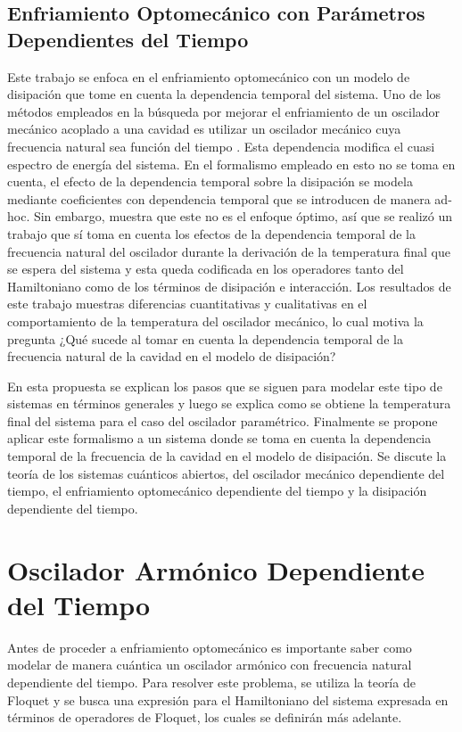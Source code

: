 \documentclass[10pt,a4paper]{report}
\begin{document}
\section{Enfriamiento Optomecánico con Parámetros Dependientes del Tiempo}

Este trabajo se enfoca en el enfriamiento optomecánico con un modelo de disipación que tome en cuenta la dependencia temporal del sistema. Uno de los métodos empleados en la búsqueda por mejorar el enfriamiento de un oscilador mecánico acoplado a una
cavidad es utilizar un oscilador mecánico cuya frecuencia natural sea
función del tiempo \cite{BarberisLC}. Esta dependencia modifica el
cuasi espectro de energía del sistema\cite{HanngiFM}. En el formalismo
empleado en \cite{BarberisLC} esto no se toma en cuenta, el efecto de la dependencia temporal sobre la disipación se modela mediante coeficientes con dependencia temporal que se introducen de manera ad-hoc.  Sin embargo, \cite{HanngiFM} muestra que este no es el enfoque óptimo, así que se
realizó un trabajo que sí toma en cuenta los efectos de la dependencia
temporal de la frecuencia natural del oscilador durante la derivación
de la temperatura final que se espera del sistema \cite{YanesOC} y esta queda codificada en los operadores tanto del Hamiltoniano como de los términos de disipación e interacción. Los
resultados de este trabajo muestras diferencias cuantitativas y
cualitativas en el comportamiento de la temperatura del oscilador
mecánico, lo cual motiva la pregunta ¿Qué sucede al tomar en cuenta la
dependencia temporal de la frecuencia natural de la cavidad en el modelo de disipación?

En esta propuesta se explican los pasos que se siguen para modelar
este tipo de sistemas en términos generales y luego se explica como se
obtiene la temperatura final del sistema para el caso del oscilador paramétrico. Finalmente se propone
aplicar este formalismo a un sistema donde se toma en cuenta la
dependencia temporal de la frecuencia de la cavidad en el modelo de disipación. Se
discute la teoría de los sistemas cuánticos abiertos, del oscilador
mecánico dependiente del tiempo, el enfriamiento optomecánico
dependiente del tiempo y la disipación dependiente del tiempo.




\chapter{Oscilador Armónico Dependiente del Tiempo}

Antes de proceder a enfriamiento optomecánico es importante saber como
modelar de manera cuántica un oscilador armónico con frecuencia
natural dependiente del tiempo. Para resolver este problema, se
utiliza la teoría de Floquet \cite{WardFT} y se busca una expresión
para el Hamiltoniano del sistema expresada en términos de operadores
de Floquet, los cuales se definirán más adelante.
\end{document}
